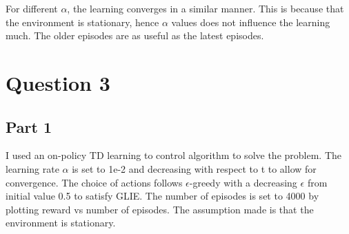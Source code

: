 \documentclass{article}
\begin{document}
    For different $\alpha$, the learning converges in a similar manner.
    This is because that the environment is stationary, hence $\alpha$ values does not influence the learning much.
    The older episodes are as useful as the latest episodes.


    \section{Question 3}\label{sec:question-3}

    \subsection{Part 1}\label{subsec:question-3-1}
    I used an on-policy TD learning to control algorithm to solve the problem.
    The learning rate $\alpha$ is set to 1e-2 and decreasing with respect to t to allow for convergence.
    The choice of actions follows $\epsilon$-greedy with a decreasing $\epsilon$ from initial value 0.5 to satisfy GLIE.
    The number of episodes is set to 4000 by plotting reward vs number of episodes.
    The assumption made is that the environment is stationary.
\end{document}
